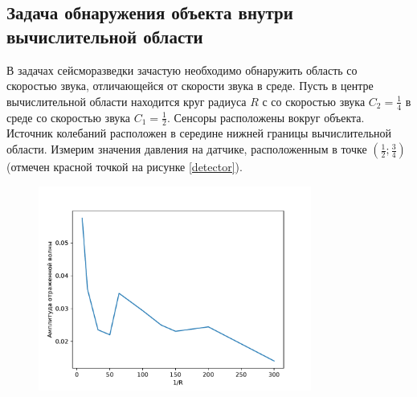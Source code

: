 \documentclass[a4paper, fontsize=14pt]{article}
\begin{document}
\subsection{Задача обнаружения объекта внутри вычислительной области}
В задачах сейсморазведки зачастую необходимо обнаружить область со скоростью звука, отличающейся от
скорости звука в среде. Пусть в центре вычислительной области находится круг радиуса $R$ с со
скоростью звука $C_2 = \frac{1}{4}$ в среде со скоростью звука $C_1 = \frac{1}{2}$. Сенсоры
расположены вокруг объекта. Источник колебаний расположен в середине нижней границы вычислительной области.
Измерим значения давления на датчике, расположенным в точке $\left(\frac{1}{2};\frac{3}{4}\right)$
(отмечен красной точкой на рисунке \ref{detector}).
\begin{figure}
    \centering
	\includegraphics[width=0.8\textwidth]{refl_amp_inv.pdf}
    \caption{}
    \label{reflamp}
\end{figure}
\end{document}

